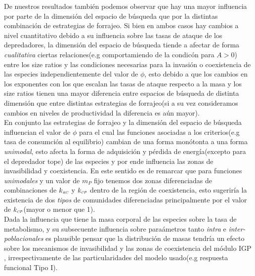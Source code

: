 De nuestros resultados tambi\'en podemos observar que hay una mayor influencia por parte de la dimensi\'on del espacio de b\'usqueda que por la distintas combinaci\'on de estrategias de forrajeo. Si bien en ambos casos hay cambios a nivel cuantitativo debido a su influencia sobre las tasas de ataque de los depredadores, la dimensi\'on del espacio de b\'usqueda tiende a afectar de forma \emph{cualitativa} ciertas relaciones(e.g comportamiendo de la condic\'on para $A >0$) entre los size ratios y las condiciones necesarias para la invasi\'on o coexistencia de las especies independientemente del valor de $\phi$, esto debido a que los cambios en los exponentes con los que escalan las tasas de ataque respecto a la masa y los size ratios tienen una mayor diferencia entre espacios de b\'usqueda de distinta dimensi\'on que entre distintas estrategias de forrajeo(si a su vez consideramos cambios en niveles de productividad la diferencia es a\'un mayor). \\

En conjunto las estrategias de forrajeo y la dimensi\'on del espacio de b\'usqueda influencian el valor de $\phi$ para el cual las funciones asociadas a los criterios(e.g tasa de consumci\'on al equilibrio) cambian de una forma mon\'otonta a una forma \emph{unimodal}, esto afecta la forma de adquisici\'on y p\'erdida de energ\'ia(excepto para el depredador tope) de las especies y por ende influencia las zonas de invasibilidad y coexistencia. En este sentido es de remarcar que para funciones \emph{unimodales} y un valor de $m_P$ fijo tenemos dos zonas diferenciadas de combinaciones de $k_{\textit{\tiny RC}}$ y $k_{\textit{\tiny CP}}$ dentro de la regi\'on de coexistencia, esto sugerir\'ia la existencia de dos \emph{tipos} de comunidades diferenciadas principalmente por el valor de $k_{\textit{\tiny CP}}$(mayor o menor que 1). \\

Dada la influencia que tiene la masa corporal de las especies sobre la tasa de metabolismo, y su subsecuente influencia sobre para\'ametros tanto \emph{intra} e \emph{inter-poblacionales}\citep{savage2004predominance,brown2004toward,west1997general,savage2004effects,pawar2012dimensionality,mcgill2006allometric,peters1986ecological,kiltie2000scaling,yodzis1992body} es plausible pensar que la distribuci\'on de masas tendr\'ia un efecto sobre los mecanismos de invasibilidad y las zonas de coexistencia del m\'odulo IGP , irrespectivamente de las particularidades del modelo usado(e.g respuesta funcional Tipo I).\\



